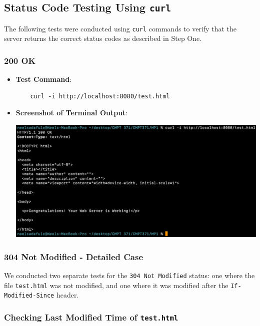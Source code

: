 \documentclass{article}
\begin{document}
\subsection*{Status Code Testing Using \texttt{curl}}

The following tests were conducted using \texttt{curl} commands to verify that the server returns the correct status codes as described in Step One.

\subsubsection*{200 OK}
\begin{itemize}
    \item \textbf{Test Command}:
    \begin{lstlisting}
    curl -i http://localhost:8080/test.html
    \end{lstlisting}
    \item \textbf{Screenshot of Terminal Output}:
    \begin{center}
        \includegraphics[width=\textwidth]{screenshots/200_OK.png}
    \end{center}
\end{itemize}

\subsubsection*{304 Not Modified - Detailed Case}

We conducted two separate tests for the \texttt{304 Not Modified} status: one where the file \texttt{test.html} was not modified, and one where it was modified after the \texttt{If-Modified-Since} header.

\subsubsection*{Checking Last Modified Time of \texttt{test.html}}
\end{document}
